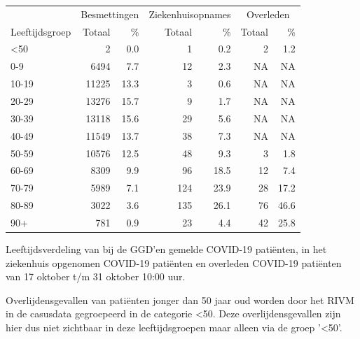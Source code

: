 \documentclass[
  english,
  man,floatsintext]{apa6}
\begin{document}
\begin{table}
\centering\begingroup\fontsize{11}{13}\selectfont

\begin{threeparttable}
\begin{tabular}{lrrrrrr}
\toprule
\multicolumn{1}{c}{ } & \multicolumn{2}{c}{Besmettingen} & \multicolumn{2}{c}{Ziekenhuisopnames} & \multicolumn{2}{c}{Overleden} \\
\cmidrule(l{3pt}r{3pt}){2-3} \cmidrule(l{3pt}r{3pt}){4-5} \cmidrule(l{3pt}r{3pt}){6-7}
Leeftijdsgroep & Totaal & \% & Totaal & \% & Totaal & \%\\
\midrule
<50 & 2 & 0.0 & 1 & 0.2 & 2 & 1.2\\
0-9 & 6494 & 7.7 & 12 & 2.3 & NA & NA\\
10-19 & 11225 & 13.3 & 3 & 0.6 & NA & NA\\
20-29 & 13276 & 15.7 & 9 & 1.7 & NA & NA\\
30-39 & 13118 & 15.6 & 29 & 5.6 & NA & NA\\
40-49 & 11549 & 13.7 & 38 & 7.3 & NA & NA\\
50-59 & 10576 & 12.5 & 48 & 9.3 & 3 & 1.8\\
60-69 & 8309 & 9.9 & 96 & 18.5 & 12 & 7.4\\
70-79 & 5989 & 7.1 & 124 & 23.9 & 28 & 17.2\\
80-89 & 3022 & 3.6 & 135 & 26.1 & 76 & 46.6\\
90+ & 781 & 0.9 & 23 & 4.4 & 42 & 25.8\\
\bottomrule
\end{tabular}
\begin{tablenotes}
\item[1] Leeftijdsverdeling van bij de GGD’en gemelde COVID-19 patiënten, in het ziekenhuis opgenomen COVID-19 patiënten en overleden COVID-19 patiënten van 17 oktober t/m 31 oktober 10:00 uur.
\item[2] Overlijdensgevallen van patiënten jonger dan 50 jaar oud worden door het RIVM in de casusdata gegroepeerd in de categorie <50. Deze overlijdensgevallen zijn hier dus niet zichtbaar in deze leeftijdsgroepen maar alleen via de groep '<50'.
\end{tablenotes}
\end{threeparttable}
\endgroup{}
\end{table}

\newpage
\end{document}

